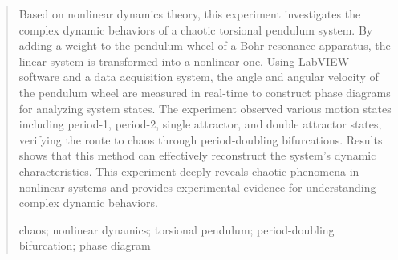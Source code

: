 \documentclass[12pt,a4paper]{article}
\begin{document}
\begin{quote}
    \fontsize{9}{10.8}\selectfont
    \setlength{\leftskip}{2em}
    \setlength{\rightskip}{2em}

    Based on nonlinear dynamics theory, this experiment investigates the complex dynamic behaviors of a chaotic torsional pendulum system. By adding a weight to the pendulum wheel of a Bohr resonance apparatus, the linear system is transformed into a nonlinear one. Using LabVIEW software and a data acquisition system, the angle and angular velocity of the pendulum wheel are measured in real-time to construct phase diagrams for analyzing system states. The experiment observed various motion states including period-1, period-2,  single attractor, and double attractor states, verifying the route to chaos through period-doubling bifurcations. Results shows that this method can effectively reconstruct the system's dynamic characteristics. This experiment deeply reveals chaotic phenomena in nonlinear systems and provides experimental evidence for understanding complex dynamic behaviors.
    
    \vspace{0.5\baselineskip}
    chaos; nonlinear dynamics; torsional pendulum; period-doubling bifurcation; phase diagram
\end{quote}

\vspace{1cm}
\end{document}
